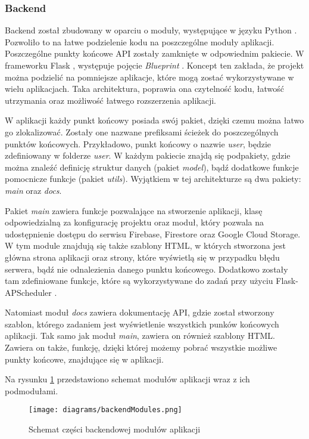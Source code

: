 \subsubsection{Backend}
Backend został zbudowany w oparciu o moduły, występujące w języku Python \cite{python}. Pozwoliło to na łatwe podzielenie kodu na poszczególne moduły aplikacji. Poszczególne punkty końcowe API zostały zamknięte w odpowiednim pakiecie. W frameworku Flask \cite{flask}, występuje pojęcie \textit{Blueprint} \cite{flask_blueprint}. Koncept ten zakłada, że projekt można podzielić na pomniejsze aplikacje, które mogą zostać wykorzystywane w wielu aplikacjach. Taka architektura, poprawia ona czytelność kodu, łatwość utrzymania oraz możliwość łatwego rozszerzenia aplikacji.

W aplikacji każdy punkt końcowy posiada swój pakiet, dzięki czemu można łatwo go zlokalizować. Zostały one nazwane prefiksami ścieżek do poszczególnych punktów końcowych. Przykładowo, punkt końcowy o nazwie \textit{user}, będzie zdefiniowany w folderze \textit{user}. W każdym pakiecie znajdą się podpakiety, gdzie można znaleźć definicję struktur danych (pakiet \textit{model}), bądź dodatkowe funkcje pomocnicze funkcje (pakiet \textit{utils}). Wyjątkiem w tej architekturze są dwa pakiety: \textit{main} oraz \textit{docs}.

Pakiet \textit{main} zawiera funkcje pozwalające na stworzenie aplikacji, klasę odpowiedzialną za konfigurację projektu oraz moduł, który pozwala na udostępnienie dostępu do serwisu Firebase, Firestore oraz Google Cloud Storage. W tym module znajdują się także szablony HTML, w których stworzona jest główna strona aplikacji oraz strony, które wyświetlą się w przypadku błędu serwera, bądź nie odnalezienia danego punktu końcowego. Dodatkowo zostały tam zdefiniowane funkcje, które są wykorzystywane do zadań przy użyciu Flask-APScheduler \cite{flask_apscheduler}.

Natomiast moduł \textit{docs} zawiera dokumentację API, gdzie został stworzony szablon, którego zadaniem jest wyświetlenie wszystkich punków końcowych aplikacji. Tak samo jak moduł \textit{main}, zawiera on również szablony HTML. Zawiera on także, funkcję, dzięki której możemy pobrać wszystkie możliwe punkty końcowe, znajdujące się w aplikacji.

Na rysunku \ref*{backend} przedstawiono schemat modułów aplikacji wraz z ich podmodułami.

\begin{figure}[H]
    \centering
    \texttt{[image: diagrams/backendModules.png]}
    \caption{Schemat części backendowej modułów aplikacji}
    \label{backend}
\end{figure}

